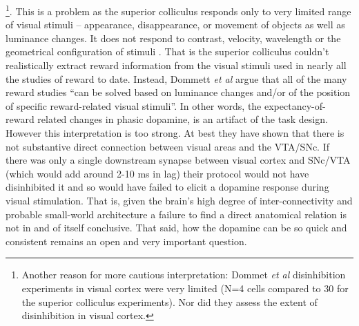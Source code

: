 \documentclass[doc,12pt]{apa}        %
\begin{document}
\footnote{
    Another reason for more cautious interpretation: Dommet \emph{et al} disinhibition experiments in visual cortex were very limited (N=4 cells compared to 30 for the superior colliculus experiments).  Nor did they assess the extent of disinhibition in visual cortex.
}. This is a problem as the superior colliculus responds only to very limited range of visual stimuli -- appearance, disappearance, or movement of objects as well as luminance changes.  It does not respond to contrast, velocity, wavelength or the geometrical configuration of stimuli \cite{Dommett:2005p7263}. That is the superior colliculus couldn't realistically extract reward information from the visual stimuli used in nearly all the studies of reward to date.  Instead, Dommett \emph{et al} argue that all of the many reward studies ``can be solved based on luminance changes and/or of the position of specific reward-related visual stimuli''.  In other words, the expectancy-of-reward related changes in phasic dopamine, is an artifact of the task design.  However this interpretation is too strong.  At best they have shown that there is not substantive direct connection between visual areas and the VTA/SNc.  If there was only a single downstream synapse between visual cortex and SNc/VTA (which would add around 2-10 ms in lag) their protocol would not have disinhibited it and so would have failed to elicit a dopamine response during visual stimulation.   That is, given the brain's high degree of inter-connectivity and probable small-world architecture \cite{bassett:2006aa} a failure to find a direct anatomical relation is not in and of itself conclusive.  That said, how the dopamine can be so quick and consistent remains an open and very important question.
\end{document}
